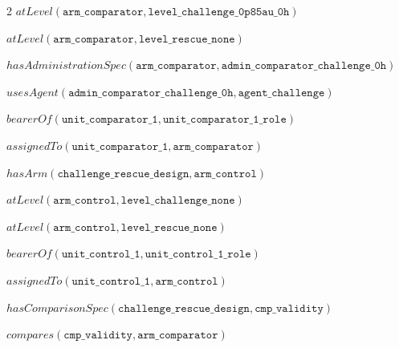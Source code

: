 \documentclass[10pt,a4paper]{article}
\begin{document}
{\begin{multicols}{2}
$\mathit{atLevel}(\mathtt{arm\_\allowbreak{}\allowbreak{}comparator}, \mathtt{level\_\allowbreak{}\allowbreak{}challenge\_\allowbreak{}\allowbreak{}0p85au\_\allowbreak{}\allowbreak{}0h})$\par
$\mathit{atLevel}(\mathtt{arm\_\allowbreak{}\allowbreak{}comparator}, \mathtt{level\_\allowbreak{}\allowbreak{}rescue\_\allowbreak{}\allowbreak{}none})$\par
$\mathit{hasAdministrationSpec}(\mathtt{arm\_\allowbreak{}\allowbreak{}comparator}, \mathtt{admin\_\allowbreak{}\allowbreak{}comparator\_\allowbreak{}\allowbreak{}challenge\_\allowbreak{}\allowbreak{}0h})$\par
$\mathit{usesAgent}(\mathtt{admin\_\allowbreak{}\allowbreak{}comparator\_\allowbreak{}\allowbreak{}challenge\_\allowbreak{}\allowbreak{}0h}, \mathtt{agent\_\allowbreak{}\allowbreak{}challenge})$\par
$\mathit{bearerOf}(\mathtt{unit\_\allowbreak{}\allowbreak{}comparator\_\allowbreak{}\allowbreak{}1}, \mathtt{unit\_\allowbreak{}\allowbreak{}comparator\_\allowbreak{}\allowbreak{}1\_\allowbreak{}\allowbreak{}role})$\par
$\mathit{assignedTo}(\mathtt{unit\_\allowbreak{}\allowbreak{}comparator\_\allowbreak{}\allowbreak{}1}, \mathtt{arm\_\allowbreak{}\allowbreak{}comparator})$\par
$\mathit{hasArm}(\mathtt{challenge\_\allowbreak{}\allowbreak{}rescue\_\allowbreak{}\allowbreak{}design}, \mathtt{arm\_\allowbreak{}\allowbreak{}control})$\par
$\mathit{atLevel}(\mathtt{arm\_\allowbreak{}\allowbreak{}control}, \mathtt{level\_\allowbreak{}\allowbreak{}challenge\_\allowbreak{}\allowbreak{}none})$\par
$\mathit{atLevel}(\mathtt{arm\_\allowbreak{}\allowbreak{}control}, \mathtt{level\_\allowbreak{}\allowbreak{}rescue\_\allowbreak{}\allowbreak{}none})$\par
$\mathit{bearerOf}(\mathtt{unit\_\allowbreak{}\allowbreak{}control\_\allowbreak{}\allowbreak{}1}, \mathtt{unit\_\allowbreak{}\allowbreak{}control\_\allowbreak{}\allowbreak{}1\_\allowbreak{}\allowbreak{}role})$\par
$\mathit{assignedTo}(\mathtt{unit\_\allowbreak{}\allowbreak{}control\_\allowbreak{}\allowbreak{}1}, \mathtt{arm\_\allowbreak{}\allowbreak{}control})$\par
$\mathit{hasComparisonSpec}(\mathtt{challenge\_\allowbreak{}\allowbreak{}rescue\_\allowbreak{}\allowbreak{}design}, \mathtt{cmp\_\allowbreak{}\allowbreak{}validity})$\par
$\mathit{compares}(\mathtt{cmp\_\allowbreak{}\allowbreak{}validity}, \mathtt{arm\_\allowbreak{}\allowbreak{}comparator})$\par\end{multicols}}
\end{document}
